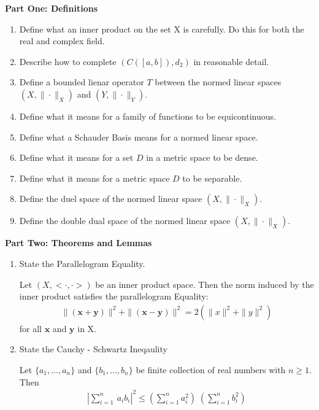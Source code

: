 \documentclass[11pt]{SelfArxOneColBMN}
\affiliation{\textsuperscript{1}\textit{John E. Walker Department of Economics,
Clemson University,Clemson, SC: email ijdavis@g.clemson.edu}}
\date{\small{Version ~\today}}
\begin{document}
\flushbottom

\maketitle

\renewcommand{\theexercise}{\arabic{exercise}}%

\textbf{Part One: Definitions}
\begin{enumerate}
  \item Define what an inner product on the set X is carefully. Do this for both the real and complex field.
  \item Describe how to complete $(C([a,b]),d_2)$ in reasonable detail.
  \item Define a bounded lienar operator $T$ between the normed linear spaces $(X,\|\cdot\|_X)$ and $(Y,\|\cdot\|_Y)$.
  \item Define what it means for a family of functions to be equicontinuous.
  \item Define what a Schauder Basis means for a normed linear space.
  \item Define what it means for a set $D$ in a metric space to be dense.
  \item Define what it means for a metric space $D$ to be separable.
  \item Define the duel space of the normed linear space $(X,\|\cdot\|_X)$.
  \item Define the double dual space of the normed linear space $(X,\|\cdot\|_X)$.
\end{enumerate}

\textbf{Part Two: Theorems and Lemmas}
\begin{enumerate}
  \item State the Parallelogram Equality.
  \begin{solution}
    Let $(X,<\cdot,\cdot>)$ be an inner product space. Then the norm induced by the inner product satisfies the parallelogram Equality:
    \begin{eqnarray*}
      \|(\mathbf{x} + \mathbf{y})\|^2 + \|(\mathbf{x} - \mathbf{y})\|^2 = 2(\|x\|^2 + \|y\|^2)
    \end{eqnarray*}
    for all $\mathbf{x}$ and $\mathbf{y}$ in X.
  \end{solution}
  \item State the Cauchy - Schwartz Ineqaulity
  \begin{solution}
    Let $\{a_1,...,a_n\}$ and $\{b_1,...,b_n\}$ be finite collection of real numbers with $n \geq 1$. Then
    \begin{eqnarray*}
      |\sum_{i=1}^n\:a_ib_i|^2 \leq (\sum_{i=1}^na_i^2)\;(\sum_{i=1}^nb_i^2)
    \end{eqnarray*}
  \end{solution}
\end{enumerate}
\end{document}
